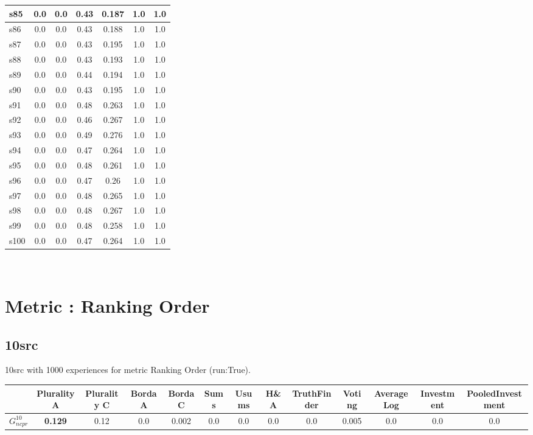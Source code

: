 \documentclass{article}
\newcommand{\graph}[2]{$G_{#1}^{#2}$}
\begin{document}
\begin{tabular}{|l|c|c|c|c|c|c|}
\hline
s85 &0.0 & 0.0 & 0.43 & 0.187 & 1.0 & 1.0\\
\hline
s86 &0.0 & 0.0 & 0.43 & 0.188 & 1.0 & 1.0\\
\hline
s87 &0.0 & 0.0 & 0.43 & 0.195 & 1.0 & 1.0\\
\hline
s88 &0.0 & 0.0 & 0.43 & 0.193 & 1.0 & 1.0\\
\hline
s89 &0.0 & 0.0 & 0.44 & 0.194 & 1.0 & 1.0\\
\hline
s90 &0.0 & 0.0 & 0.43 & 0.195 & 1.0 & 1.0\\
\hline
s91 &0.0 & 0.0 & 0.48 & 0.263 & 1.0 & 1.0\\
\hline
s92 &0.0 & 0.0 & 0.46 & 0.267 & 1.0 & 1.0\\
\hline
s93 &0.0 & 0.0 & 0.49 & 0.276 & 1.0 & 1.0\\
\hline
s94 &0.0 & 0.0 & 0.47 & 0.264 & 1.0 & 1.0\\
\hline
s95 &0.0 & 0.0 & 0.48 & 0.261 & 1.0 & 1.0\\
\hline
s96 &0.0 & 0.0 & 0.47 & 0.26 & 1.0 & 1.0\\
\hline
s97 &0.0 & 0.0 & 0.48 & 0.265 & 1.0 & 1.0\\
\hline
s98 &0.0 & 0.0 & 0.48 & 0.267 & 1.0 & 1.0\\
\hline
s99 &0.0 & 0.0 & 0.48 & 0.258 & 1.0 & 1.0\\
\hline
s100 &0.0 & 0.0 & 0.47 & 0.264 & 1.0 & 1.0\\
\hline
\end{tabular}\\

\newpage
\section{Metric : Ranking Order}

\newpage

\subsection{10src}

10src with 1000 experiences for metric Ranking Order (run:True).

\noindent\begin{tabular}{|l|c|c|c|c|c|c|c|c|c|c|c|c|}
\hline
& Plurality A& Plurality C& Borda A& Borda C& Sums& Usums& H\&A& TruthFinder& Voting& AverageLog& Investment& PooledInvestment\\
\hline
\graph{ncpr}{10} &\textbf{0.129}&0.12&0.0&0.002&0.0&0.0&0.0&0.0&0.005&0.0&0.0&0.0\\
\hline
\end{tabular}
\newpage
\end{document}
